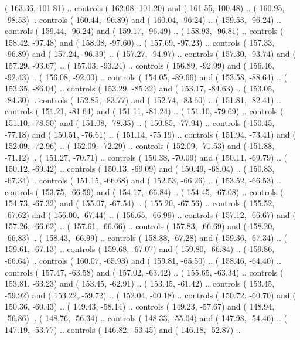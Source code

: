 {        ( 163.36,-101.81) .. controls ( 162.08,-101.20) and ( 161.55,-100.48) ..
        ( 160.95, -98.53) .. controls ( 160.44, -96.89) and ( 160.04, -96.24) ..
        ( 159.53, -96.24) .. controls ( 159.44, -96.24) and ( 159.17, -96.49) ..
        ( 158.93, -96.81) .. controls ( 158.42, -97.48) and ( 158.08, -97.60) ..
        ( 157.69, -97.23) .. controls ( 157.33, -96.89) and ( 157.24, -96.39) ..
        ( 157.27, -94.97) .. controls ( 157.30, -93.74) and ( 157.29, -93.67) ..
        ( 157.03, -93.24) .. controls ( 156.89, -92.99) and ( 156.46, -92.43) ..
        ( 156.08, -92.00) .. controls ( 154.05, -89.66) and ( 153.58, -88.64) ..
        ( 153.35, -86.04) .. controls ( 153.29, -85.32) and ( 153.17, -84.63) ..
        ( 153.05, -84.30) .. controls ( 152.85, -83.77) and ( 152.74, -83.60) ..
        ( 151.81, -82.41) .. controls ( 151.21, -81.64) and ( 151.11, -81.24) ..
        ( 151.10, -79.69) .. controls ( 151.10, -78.50) and ( 151.08, -78.35) ..
        ( 150.85, -77.94) .. controls ( 150.45, -77.18) and ( 150.51, -76.61) ..
        ( 151.14, -75.19) .. controls ( 151.94, -73.41) and ( 152.09, -72.96) ..
        ( 152.09, -72.29) .. controls ( 152.09, -71.53) and ( 151.88, -71.12) ..
        ( 151.27, -70.71) .. controls ( 150.38, -70.09) and ( 150.11, -69.79) ..
        ( 150.12, -69.42) .. controls ( 150.13, -69.09) and ( 150.49, -68.04) ..
        ( 150.83, -67.34) .. controls ( 151.15, -66.68) and ( 152.53, -66.26) ..
        ( 153.52, -66.53) .. controls ( 153.75, -66.59) and ( 154.17, -66.84) ..
        ( 154.45, -67.08) .. controls ( 154.73, -67.32) and ( 155.07, -67.54) ..
        ( 155.20, -67.56) .. controls ( 155.52, -67.62) and ( 156.00, -67.44) ..
        ( 156.65, -66.99) .. controls ( 157.12, -66.67) and ( 157.26, -66.62) ..
        ( 157.61, -66.66) .. controls ( 157.83, -66.69) and ( 158.20, -66.83) ..
        ( 158.43, -66.99) .. controls ( 158.88, -67.28) and ( 159.36, -67.34) ..
        ( 159.61, -67.13) .. controls ( 159.68, -67.07) and ( 159.80, -66.84) ..
        ( 159.86, -66.64) .. controls ( 160.07, -65.93) and ( 159.81, -65.50) ..
        ( 158.46, -64.40) .. controls ( 157.47, -63.58) and ( 157.02, -63.42) ..
        ( 155.65, -63.34) .. controls ( 153.81, -63.23) and ( 153.45, -62.91) ..
        ( 153.45, -61.42) .. controls ( 153.45, -59.92) and ( 153.22, -59.72) ..
        ( 152.04, -60.18) .. controls ( 150.72, -60.70) and ( 150.36, -60.43) ..
        ( 149.43, -58.14) .. controls ( 149.23, -57.67) and ( 148.94, -56.86) ..
        ( 148.76, -56.34) .. controls ( 148.33, -55.04) and ( 147.98, -54.46) ..
        ( 147.19, -53.77) .. controls ( 146.82, -53.45) and ( 146.18, -52.87) ..
}
